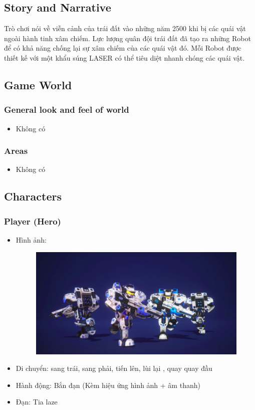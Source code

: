 \documentclass[../report.tex]{subfiles}
\begin{document}
\subsection{Story and Narrative}
Trò chơi nói về viễn cảnh của trái đất vào những
năm 2500 khi bị các quái vật ngoài hành tinh xâm chiếm.
Lực lượng quân đội trái đất đã tạo ra những Robot
để có khả năng chống lại sự xâm chiếm của các quái vật đó.
Mỗi Robot được thiết kế với một khẩu súng LASER có
thể tiêu diệt nhanh chóng các quái vật. 

\subsection{Game World}
\subsubsection{General look and feel of world}
\begin{itemize}
\item Không có
\end{itemize}

\subsubsection{Areas}
\begin{itemize}
\item Không có
\end{itemize}

\subsection{Characters}
\subsubsection{Player (Hero)}
\begin{itemize}
\item Hình ảnh:
\begin{figure}[H]
\centering
\includegraphics[width=15cm]{figures/hero.png}
\end{figure}

\item Di chuyển: sang trái, sang phải,
tiến lên, lùi lại , quay quay đầu
\item Hành động: Bắn đạn (Kèm hiệu ứng hình ảnh + âm thanh)
\item Đạn: Tia laze
\end{itemize}
\end{document}
